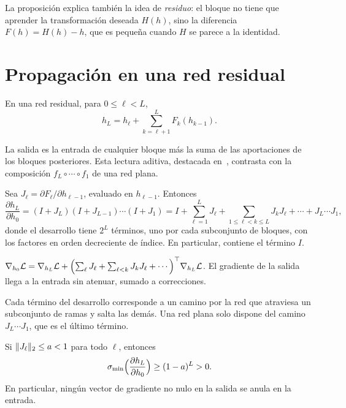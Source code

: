 La proposición explica también la idea de \emph{residuo}: el bloque no tiene que aprender la transformación deseada $H(h)$, sino la diferencia $F(h)=H(h)-h$, que es pequeña cuando $H$ se parece a la identidad.

\section{Propagación en una red residual}

\begin{proposicion}\label{prop:adelante}
En una red residual, para $0\le\ell<L$,
\[
h_L=h_\ell+\sum_{k=\ell+1}^{L}F_k(h_{k-1}).
\]
\end{proposicion}

La salida es la entrada de cualquier bloque más la suma de las aportaciones de los bloques posteriores. Esta lectura aditiva, destacada en~\cite[§2]{resnet-id}, contrasta con la composición $f_L\circ\cdots\circ f_1$ de una red plana.

\begin{teorema}\label{teo:jac-residual}
Sea $J_\ell=\partial F_\ell/\partial h_{\ell-1}$, evaluado en $h_{\ell-1}$. Entonces
\[
\frac{\partial h_L}{\partial h_0}=(I+J_L)(I+J_{L-1})\cdots(I+J_1)
=I+\sum_{\ell=1}^{L}J_\ell+\sum_{1\le\ell<k\le L}J_kJ_\ell+\cdots+J_L\cdots J_1,
\]
donde el desarrollo tiene $2^{L}$ términos, uno por cada subconjunto de bloques, con los factores en orden decreciente de índice. En particular, contiene el término $I$.
\end{teorema}

\begin{corolario}\label{cor:grad-residual}
$\nabla_{h_0}\mathcal{L}=\nabla_{h_L}\mathcal{L}+\Bigl(\sum_{\ell}J_\ell+\sum_{\ell<k}J_kJ_\ell+\cdots\Bigr)^{\top}\nabla_{h_L}\mathcal{L}$. El gradiente de la salida llega a la entrada sin atenuar, sumado a correcciones.
\end{corolario}

Cada término del desarrollo corresponde a un camino por la red que atraviesa un subconjunto de ramas y salta las demás. Una red plana solo dispone del camino $J_L\cdots J_1$, que es el último término.

\addtocounter{definicion}{1}%

\begin{proposicion}\label{prop:cota-residual}
Si $\lVert J_\ell\rVert_2\le a<1$ para todo $\ell$, entonces
\[
\sigma_{\min}\Bigl(\frac{\partial h_L}{\partial h_0}\Bigr)\ge(1-a)^{L}>0 .
\]
En particular, ningún vector de gradiente no nulo en la salida se anula en la entrada.
\end{proposicion}

